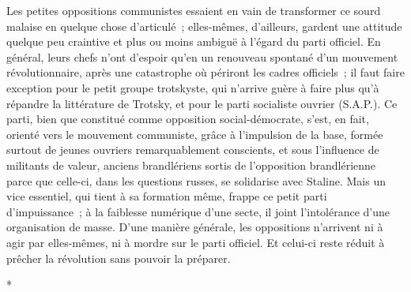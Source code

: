 \documentclass[french,twoside]{book} %
\begin{document}
Les petites oppositions communistes essaient en vain de transformer ce sourd malaise en quelque chose d'articulé ; elles-mêmes, d'ailleurs, gardent une attitude quelque peu craintive et plus ou moins ambiguë à l'égard du parti officiel. En général, leurs chefs n'ont d'espoir qu'en un renouveau spontané d'un mouvement révolutionnaire, après une catastrophe où périront les cadres officiels ; il faut faire exception pour le petit groupe trotskyste, qui n'arrive guère à faire plus qu'à répandre la littérature de Trotsky, et pour le parti socialiste ouvrier (S.A.P.). Ce parti, bien que constitué comme opposition social-démocrate, s'est, en fait, orienté vers le mouvement communiste, grâce à l'impulsion de la base, formée surtout de jeunes ouvriers remarquablement conscients, et sous l'influence de militants de valeur, anciens brandlériens sortis de l'opposition brandlérienne parce que celle-ci, dans les questions russes, se solidarise avec Staline. Mais un vice essentiel, qui tient à sa forma­tion même, frappe ce petit parti d'impuissance ; à la faiblesse numérique d'une secte, il joint l'intolérance d'une organisation de masse. D'une manière générale, les oppositions n'arrivent ni à agir par elles-mêmes, ni à mordre sur le parti officiel. Et celui-ci reste réduit à prêcher la révolution sans pouvoir la préparer.\par
\par

\begin{center}
\noindent \centerline{*}\par
\end{center}
\end{document}
